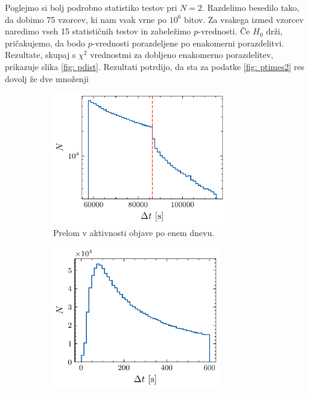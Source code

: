 \documentclass[11pt, oneside]{article}
\theoremstyle{definition}
\begin{document}
Poglejmo si bolj podrobno statistiko testov pri $N=2$. Razdelimo besedilo tako, da dobimo 75 vzorcev, ki nam
vsak vrne po $10^6$ bitov. Za vsakega izmed vzorcev naredimo vseh 15 statističnih testov in zabeležimo $p$-vrednosti.
Če $H_0$ drži, pričakujemo, da bodo $p$-vrednosti porazdeljene po enakomerni porazdelitvi.
Rezultate, skupaj s $\chi^2$ vrednostmi za dobljeno enakomerno porazdelitev, prikazuje slika \ref{fig: pdist}.
Rezultati potrdijo, da sta za podatke \ref{fig: ptimes2} res dovolj že dve množenji

\vspace*{-0.5cm}

\begin{figure}[h!]
    \centering
    \begin{subfigure}[b]{0.49\textwidth}
        \centering
        \includegraphics[width=0.83\textwidth]{reddit_post_activity_16h_to32h.pdf}
        \caption{Prelom v aktivnosti objave po enem dnevu.}
        \label{fig: ptimes1}
    \end{subfigure}
    \hfill
    \begin{subfigure}[b]{0.49\textwidth}
        \centering
        \includegraphics[width=0.8\textwidth]{reddit_post_activity_10min.pdf}

\end{subfigure}
\end{figure}
\end{document}
